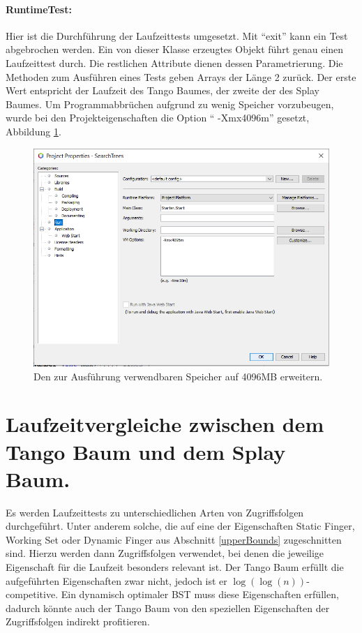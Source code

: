 \documentclass[a4paper,12pt]{article}
\begin{document}
\paragraph{RuntimeTest:}
Hier ist die Durchführung der Laufzeittests umgesetzt. Mit \enquote{exit} kann ein Test abgebrochen werden. Ein von dieser Klasse erzeugtes Objekt führt genau einen Laufzeittest durch. Die restlichen Attribute dienen dessen Parametrierung. Die Methoden zum Ausführen eines Tests  geben Arrays der Länge 2 zurück. Der erste Wert entspricht der Laufzeit des Tango Baumes, der zweite der des Splay Baumes. Um Programmabbrüchen aufgrund zu wenig Speicher vorzubeugen, wurde bei den Projekteigenschaften die Option \enquote{ -Xmx4096m} gesetzt, Abbildung \ref{fig:optionSpeicher}.
\begin{figure}[H]
	\centering
	\includegraphics[width=1\textwidth]{Medien/laufzeittest/optionSpeicher}
	\caption{Den zur Ausführung verwendbaren Speicher auf 4096MB erweitern.}
	\label{fig:optionSpeicher}
\end{figure}


\section {Laufzeitvergleiche zwischen dem Tango Baum und dem Splay Baum.}

Es werden Laufzeittests zu unterschiedlichen Arten von Zugriffsfolgen durchgeführt. Unter anderem solche, die auf eine der Eigenschaften  Static Finger,  Working Set oder Dynamic Finger aus Abschnitt \ref{upperBounds} zugeschnitten sind. Hierzu werden dann Zugriffsfolgen verwendet, bei denen die jeweilige Eigenschaft für die Laufzeit besonders relevant ist. Der Tango Baum erfüllt die aufgeführten Eigenschaften zwar nicht, jedoch ist er  $\log\left(\log\left(n\right)\right)$-competitive. Ein dynamisch optimaler BST muss diese Eigenschaften erfüllen, dadurch könnte auch der Tango Baum von den speziellen Eigenschaften der Zugriffsfolgen indirekt profitieren.  \\
\end{document}

